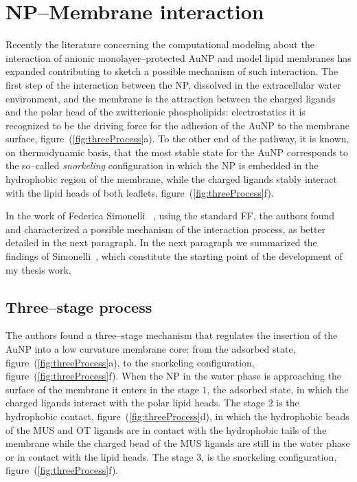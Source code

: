 \newpage
\section{NP--Membrane interaction}
\label{sec:NPMembraneInt}
Recently the literature concerning the computational modeling about the interaction of anionic 
monolayer--protected \ac{AuNP} and model lipid membranes has expanded contributing to sketch a possible mechanism 
of such interaction. The first step of the interaction between the \ac{NP}, dissolved in the extracellular 
water environment, and the membrane is the attraction between the charged ligands and the polar head of the 
zwitterionic phospholipids: electrostatics it is recognized to be the driving force for the adhesion of the 
\ac{AuNP} to the membrane surface, figure~(\ref{fig:threeProcess}a). To the other end of the pathway, it is 
known, on thermodynamic basis, that the most stable state for the \ac{AuNP} corresponds to the so--called 
\textit{snorkeling} configuration in which the \ac{NP} is embedded in the hydrophobic region of the membrane, 
while the charged ligands stably interact with the lipid heads of both leaflets, 
figure~(\ref{fig:threeProcess}f). 

In the work of Federica Simonelli \etal\, \cite{ourPaper}, using the standard \martini \ac{FF}, the authors found 
and characterized a possible mechanism of the interaction process, as better detailed in the next paragraph. In 
the next paragraph we summarized the findings of Simonelli \etal\,, which constitute the starting point of the 
development of my thesis work.

\subsection{Three--stage process}
The authors found a three--stage mechanism that regulates the insertion of the \ac{AuNP} into a low curvature 
membrane core: from the adsorbed state, figure~(\ref{fig:threeProcess}a), to the snorkeling configuration, 
figure~(\ref{fig:threeProcess}f). When the \ac{NP} in the water phase is approaching the surface of the membrane 
it enters in the stage $1$, the adsorbed state, in which the charged ligands interact with the polar lipid heads. 
The stage $2$ is the hydrophobic contact, figure~(\ref{fig:threeProcess}d), in which the hydrophobic beads of the 
\ac{MUS} and \ac{OT} ligands are in contact with the hydrophobic tails of the membrane while the charged bead of 
the \ac{MUS} ligands are still in the water phase or in contact with the lipid heads. The stage $3$, is the 
snorkeling configuration, figure~(\ref{fig:threeProcess}f). 

